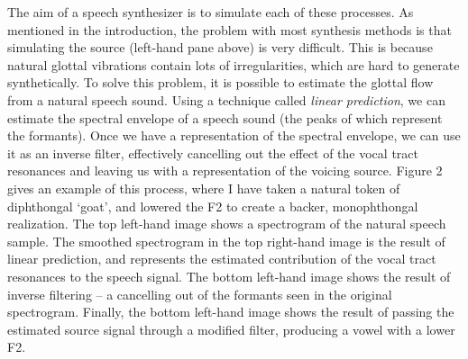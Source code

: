 \documentclass{article}\usepackage[]{graphicx}\usepackage[]{color}
\begin{document}
The aim of a speech synthesizer is to simulate each of these processes. As mentioned in the introduction, the problem with most synthesis methods is that simulating the source (left-hand pane above) is very difficult. This is because natural glottal vibrations contain lots of irregularities, which are hard to generate synthetically. 
\newpage
To solve this problem, it is possible to estimate the glottal flow from a natural speech sound. Using a technique called \textit{linear prediction}, we can estimate the spectral envelope of a speech sound (the peaks of which represent the formants). Once we have a representation of the spectral envelope, we can use it as an inverse filter, effectively cancelling out the effect of the vocal tract resonances and leaving us with a representation of the voicing source. Figure 2 gives an example of this process, where I have taken a natural token of diphthongal `goat', and lowered the F2 to create a backer, monophthongal realization. The top left-hand image shows a spectrogram of the natural speech sample. The smoothed spectrogram in the top right-hand image is the result of linear prediction, and represents the estimated contribution of the vocal tract resonances to the speech signal. The bottom left-hand image shows the result of inverse filtering -- a cancelling out of the formants seen in the original spectrogram. Finally, the bottom left-hand image shows the result of passing the estimated source signal through a modified filter, producing a vowel with a lower F2.
\end{document}
